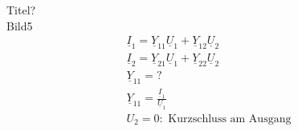 Titel?\\
Bild5\\
\begin{align}
	\underline{I}_1=\underline{Y}_11\underline{U}_1+\underline{Y}_12\underline{U}_2\nonumber\\
	\underline{I}_2=\underline{Y}_21\underline{U}_1+\underline{Y}_22\underline{U}_2\nonumber\\
	\underline{Y}_{11}=?\nonumber\\
	\underline{Y}_{11}=\frac{\underline{I}_1}{\underline{U}_1}\nonumber\\
	U_2=0: \text{ Kurzschluss am Ausgang}\nonumber\\
\end{align}